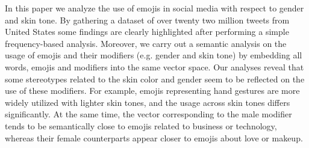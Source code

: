 In this paper we analyze the use of emojis in social media with respect to gender and skin tone. By gathering a dataset of over twenty two million tweets from United States some findings are clearly highlighted after performing a simple frequency-based analysis. Moreover, we carry out a semantic analysis on the usage of emojis and their modifiers (e.g. gender and skin tone) by embedding all words, emojis and modifiers into the same vector space. Our analyses reveal that some stereotypes related to the skin color and gender seem to be reflected on the use of these modifiers. For example, emojis representing hand gestures are more widely utilized with lighter skin tones, and the usage across skin tones differs significantly. At the same time, the vector corresponding to the male modifier tends to be semantically close to emojis related to business or technology, whereas their female counterparts appear closer to emojis about love or makeup.
